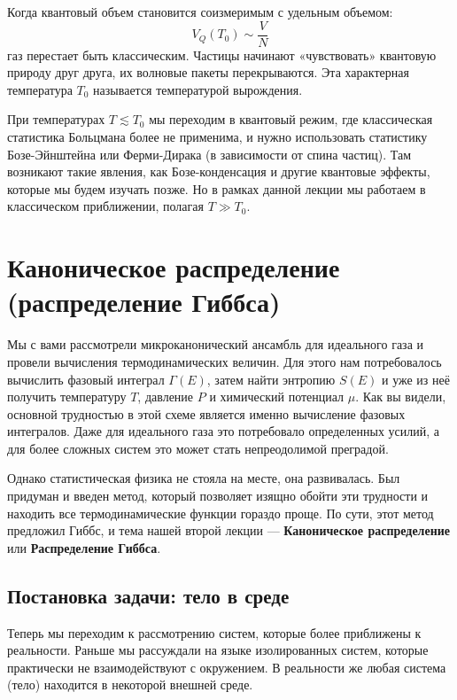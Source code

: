 \documentclass[../general/general]{subfiles}
\begin{document}
Когда квантовый объем становится соизмеримым с удельным объемом:
\begin{equation}
V_Q(T_0) \sim \frac{V}{N}
\end{equation}
газ перестает быть классическим. Частицы начинают «чувствовать» квантовую природу друг друга, их волновые пакеты перекрываются. Эта характерная температура $T_0$ называется температурой вырождения. 

При температурах $T \lesssim T_0$ мы переходим в квантовый режим, где классическая статистика Больцмана более не применима, и нужно использовать статистику Бозе-Эйнштейна или Ферми-Дирака (в зависимости от спина частиц). Там возникают такие явления, как Бозе-конденсация и другие квантовые эффекты, которые мы будем изучать позже. Но в рамках данной лекции мы работаем в классическом приближении, полагая $T \gg T_0$.


\section{Каноническое распределение (распределение Гиббса)}

Мы с вами рассмотрели микроканонический ансамбль для идеального газа и провели вычисления термодинамических величин. Для этого нам потребовалось вычислить фазовый интеграл $\Gamma(E)$, затем найти энтропию $S(E)$ и уже из неё получить температуру $T$, давление $P$ и химический потенциал $\mu$. Как вы видели, основной трудностью в этой схеме является именно вычисление фазовых интегралов. Даже для идеального газа это потребовало определенных усилий, а для более сложных систем это может стать непреодолимой преградой.

Однако статистическая физика не стояла на месте, она развивалась. Был придуман и введен метод, который позволяет изящно обойти эти трудности и находить все термодинамические функции гораздо проще. По сути, этот метод предложил Гиббс, и тема нашей второй лекции — \textbf{Каноническое распределение} или \textbf{Распределение Гиббса}.

\subsection{Постановка задачи: тело в среде}

Теперь мы переходим к рассмотрению систем, которые более приближены к реальности. Раньше мы рассуждали на языке изолированных систем, которые практически не взаимодействуют с окружением. В реальности же любая система (тело) находится в некоторой внешней среде.
\end{document}
